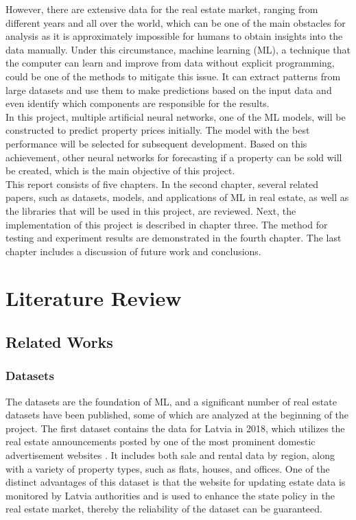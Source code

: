 \documentclass[12pt,twoside]{report}
\begin{document}
However, there are extensive data for the real estate market, ranging from different years and all over the world, which can be one of the main obstacles for analysis as it is approximately impossible for humans to obtain insights into the data manually. Under this circumstance, machine learning (ML), a technique that the computer can learn and improve from data without explicit programming, could be one of the methods to mitigate this issue. It can extract patterns from large datasets and use them to make predictions based on the input data and even identify which components are responsible for the results.
\\

In this project, multiple artificial neural networks, one of the ML models, will be constructed to predict property prices initially. The model with the best performance will be selected for subsequent development. Based on this achievement, other neural networks for forecasting if a property can be sold will be created, which is the main objective of this project. 
\\

This report consists of five chapters. In the second chapter, several related papers, such as datasets, models, and applications of ML in real estate, as well as the libraries that will be used in this project, are reviewed. Next, the implementation of this project is described in chapter three. The method for testing and experiment results are demonstrated in the fourth chapter. The last chapter includes a discussion of future work and conclusions. 

\chapter{Literature Review}
\section{Related Works} 
\subsection{Datasets}
The datasets are the foundation of ML, and a significant number of real estate datasets have been published, some of which are analyzed at the beginning of the project. The first dataset contains the data for Latvia in 2018, which utilizes the real estate announcements posted by one of the most prominent domestic advertisement websites \citep{RN22}. It includes both sale and rental data by region, along with a variety of property types, such as flats, houses, and offices. One of the distinct advantages of this dataset is that the website for updating estate data is monitored by Latvia authorities and is used to enhance the state policy in the real estate market, thereby the reliability of the dataset can be guaranteed.
\\
\end{document}
